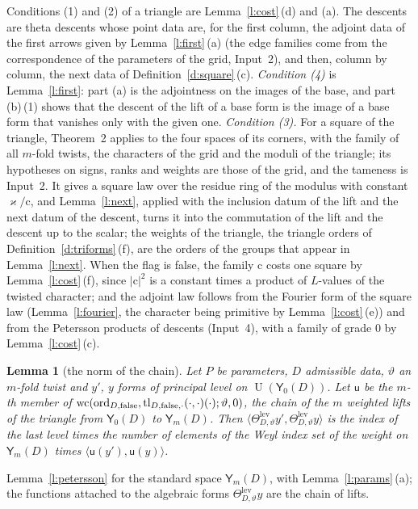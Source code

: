 \documentclass[11pt,a4paper]{article}
\makeatletter
\newcommand{\lean}[1]{\csname LN@#1\endcsname}
\newcommand{\leantag}{{\sffamily\bfseries\fontsize{6.3}{8}\selectfont\color{leancol}\addfontfeatures{LetterSpace=7}LEAN}}
\newcommand{\leanline}[1]{\par\nopagebreak\vspace{-2.5pt}{\fontsize{8.9}{12.4}\selectfont\color{inksoft}\raggedright
  \noindent\llap{\leantag\hspace{9pt}}#1\par}\vspace{1pt}}
\theoremstyle{plainx}
\newtheorem{lemma}[theorem]{Lemma}
\theoremstyle{uprightx}
\renewenvironment{proof}[1][Proof]{\par\pushQED{\qed}\normalfont\topsep0pt\partopsep0pt
  \trivlist\item[\hskip\labelsep\itshape #1.]\ignorespaces}{\popQED\endtrivlist\@endpefalse}
\newcommand{\sY}{\mathsf{Y}}
\newcommand{\rc}{\mathrm{c}}
\newcommand{\U}{\operatorname{U}}
\newcommand{\ip}[2]{\langle #1,#2\rangle}
\makeatother
\begin{document}
\begin{proof}[Proof of Theorem 3]
Conditions (1) and (2) of a triangle are Lemma~\ref{l:cost}\,(d) and (a). The descents are theta descents whose
point data are, for the first column, the adjoint data of the first arrows given by Lemma~\ref{l:first}\,(a) (the
edge families come from the correspondence of the parameters of the grid, Input~2), and then, column by column,
the next data of Definition~\ref{d:square}\,(c). \emph{Condition (4)} is Lemma~\ref{l:first}: part (a) is the
adjointness on the images of the base, and part (b)\,(1) shows that the descent of the lift of a base form is the
image of a base form that vanishes only with the given one. \emph{Condition (3).} For a square of the triangle,
Theorem~2 applies to the four spaces of its corners, with the family of all $m$-fold twists, the characters of
the grid and the moduli of the triangle; its hypotheses on signs, ranks and weights are those of the grid, and the
tameness is Input~2. It gives a square law over the residue ring of the modulus with constant $\varkappa/\rc$,
and Lemma~\ref{l:next}, applied with the inclusion datum of the lift and the next datum of the descent, turns it
into the commutation of the lift and the descent up to the scalar; the weights of the triangle, the triangle
orders of Definition~\ref{d:triforms}\,(f), are the orders of the groups that appear in Lemma~\ref{l:next}. When the flag is false, the family
$\rc$ costs one square by Lemma~\ref{l:cost}\,(f), since $|\rc|^2$ is a constant times a product of $L$-values of
the twisted character; and the adjoint law follows from the Fourier form of the square law
(Lemma~\ref{l:fourier}, the character being primitive by Lemma~\ref{l:cost}\,(e)) and from the Petersson products
of descents (Input~4), with a family of grade $0$ by Lemma~\ref{l:cost}\,(c).
\end{proof}

\begin{lemma}[the norm of the chain]\label{l:chainnorm}
Let $P$ be parameters, $D$ admissible data, $\vartheta$ an $m$-fold twist and $y'$, $y$ forms of principal level on
$\U(\sY_0(D))$. Let $\mathsf{u}$ be the $m$-th member of
$\operatorname{wc}(\mathrm{ord}_{D,\mathrm{false}},\operatorname{tl}_{D,\mathrm{false},\cdot}(\cdot,\cdot)(\cdot);\vartheta,0)$,
the chain of the $m$ weighted lifts of the triangle from $\sY_0(D)$ to $\sY_m(D)$. Then
$\ip{\Theta^{\mathrm{lev}}_{D,\vartheta}y'}{\Theta^{\mathrm{lev}}_{D,\vartheta}y}$ is the index of the last level
times the number of elements of the Weyl index set of the weight on $\sY_m(D)$ times
$\ip{\mathsf{u}(y')}{\mathsf{u}(y)}$.
\end{lemma}
\begin{proof}
Lemma~\ref{l:petersson} for the standard space $\sY_m(D)$, with Lemma~\ref{l:params}\,(a); the functions attached
to the algebraic forms $\Theta^{\mathrm{lev}}_{D,\vartheta}y$ are the chain of lifts.
\end{proof}
\leanline{\lean{inneriotaAtLevel}}
\end{document}
